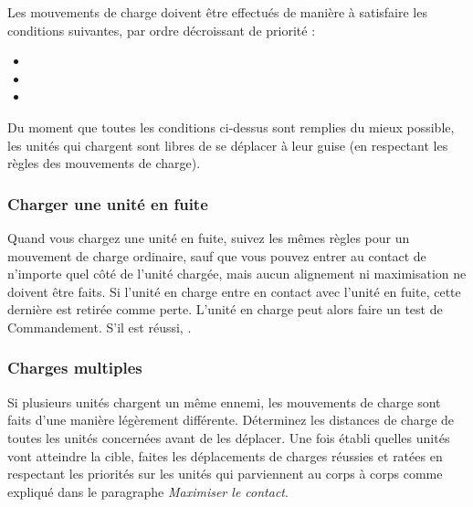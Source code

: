 Les mouvements de charge doivent être effectués de manière à satisfaire les conditions suivantes, par ordre décroissant de priorité :

\begin{itemize}[label={-}]
\item {}
\item {}
\item {}
\end{itemize}

Du moment que toutes les conditions ci-dessus sont remplies du mieux possible, les unités qui chargent sont libres de se déplacer à leur guise (en respectant les règles des mouvements de charge).


\subsubsection*{Charger une unité en fuite}

Quand vous chargez une unité en fuite, suivez les mêmes règles pour un mouvement de charge ordinaire, sauf que vous pouvez entrer au contact de n'importe quel côté de l'unité chargée, mais aucun alignement ni maximisation ne doivent être faits. Si l'unité en charge entre en contact avec l'unité en fuite, cette dernière est retirée comme perte. L'unité en charge peut alors faire un test de Commandement. S'il est réussi, .

\subsubsection*{Charges multiples}

Si plusieurs unités chargent un même ennemi, les mouvements de charge sont faits d'une manière légèrement différente. Déterminez les distances de charge de toutes les unités concernées avant de les déplacer. Une fois établi quelles unités vont atteindre la cible, faites les déplacements de charges réussies et ratées en respectant les priorités sur les unités qui parviennent au corps à corps comme expliqué dans le paragraphe \emph{Maximiser le contact}.


